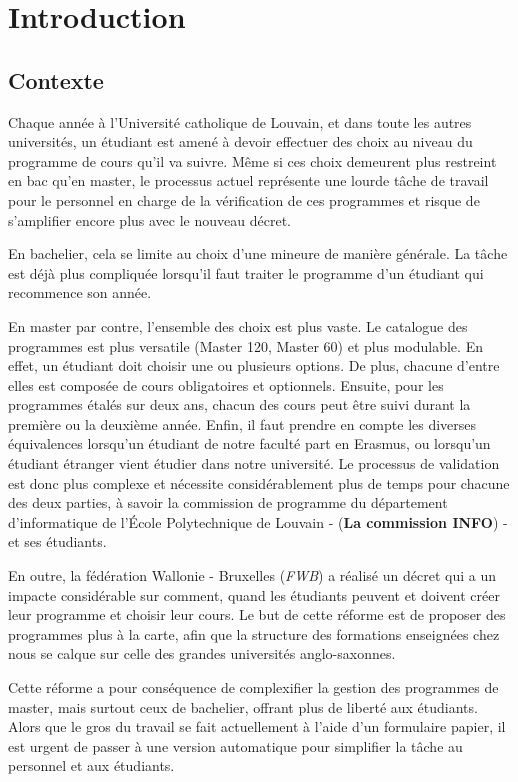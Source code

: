\chapter{Introduction}
\label{introduction}
\section{Contexte}

Chaque année à l'Université catholique de Louvain, et dans toute les autres universités, un étudiant est amené à devoir effectuer des choix au niveau du programme de cours qu'il va suivre. Même si ces choix demeurent plus restreint en bac qu'en master, le processus actuel représente une lourde tâche de travail pour le personnel en charge de la vérification de ces programmes et risque de s'amplifier encore plus avec le nouveau décret. 

En bachelier, cela se limite au choix d'une mineure de manière générale. La tâche est déjà plus compliquée lorsqu'il faut traiter le programme d'un étudiant qui recommence son année.

En master par contre, l'ensemble des choix est plus vaste. Le catalogue des programmes est plus versatile (Master 120, Master 60) et plus modulable. En effet, un étudiant doit choisir une ou plusieurs options. De plus, chacune d'entre elles est composée de cours obligatoires et optionnels. Ensuite, pour les programmes étalés sur deux ans, chacun des cours peut être suivi durant la première ou la deuxième année. Enfin, il faut prendre en compte les diverses équivalences lorsqu'un étudiant de notre faculté part en Erasmus, ou lorsqu'un étudiant étranger vient étudier dans notre université. Le processus de validation est donc plus complexe et nécessite considérablement plus de temps pour chacune des deux parties, à savoir la commission de programme du département d'informatique de l'École Polytechnique de Louvain - (\textbf{La commission INFO}) - et ses étudiants. 

En outre, la fédération Wallonie - Bruxelles (\textit{FWB}) a réalisé un décret qui a un impacte considérable sur comment, quand les étudiants  peuvent et doivent créer leur programme et choisir leur cours. Le but de cette réforme est de proposer des programmes plus à la carte,  afin que la structure des formations enseignées chez nous se calque sur celle des grandes universités anglo-saxonnes.

Cette réforme a pour conséquence de complexifier la gestion des programmes de master, mais surtout ceux de bachelier, offrant plus de liberté aux étudiants. Alors que le gros du travail se fait actuellement à l'aide d'un formulaire papier, il est urgent de passer à une version automatique pour simplifier la tâche au personnel et aux étudiants. 

